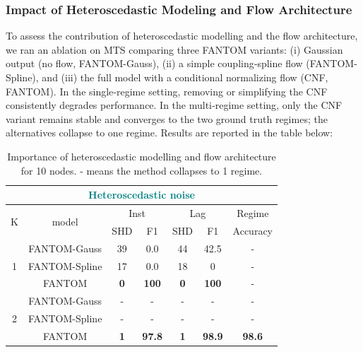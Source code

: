 \subsubsection{Impact of Heteroscedastic Modeling and Flow Architecture}
To assess the contribution of heteroscedastic modelling and the flow architecture, we ran an ablation on MTS comparing three FANTOM variants: (i) Gaussian output (no flow, FANTOM-Gauss), (ii) a simple coupling‑spline flow (FANTOM-Spline), and (iii) the full model with a conditional normalizing flow (CNF, FANTOM). In the single‑regime setting, removing or simplifying the CNF consistently degrades performance. In the multi‑regime setting, only the CNF variant remains stable and converges to the two ground truth regimes; the alternatives collapse to one regime. Results are reported in the table below:
\begin{table}[H]
\centering
\caption{Importance of heteroscedastic modelling and flow architecture for 10 nodes. - means the method collapses to 1 regime.}
\begin{tabular}{@{}ccccccc@{}}
\toprule
\multicolumn{7}{c}{\textcolor{teal}{Heteroscedastic noise}}                                                                                                                         \\ \midrule
\multicolumn{1}{c|}{\multirow{2}{*}{K}} & \multicolumn{1}{c|}{\multirow{2}{*}{model}} & \multicolumn{2}{c|}{Inst}       & \multicolumn{2}{c|}{Lag}        & Regime   \\ \cmidrule(l){3-7} 
\multicolumn{1}{c|}{}                   & \multicolumn{1}{c|}{}                       & SHD & \multicolumn{1}{c|}{F1}   & SHD & \multicolumn{1}{c|}{F1}   & Accuracy \\ \midrule
\multicolumn{1}{c|}{\multirow{3}{*}{1}} & \multicolumn{1}{c|}{FANTOM-Gauss}           & 39  & \multicolumn{1}{c|}{0.0}  & 44  & \multicolumn{1}{c|}{42.5} & -        \\
\multicolumn{1}{c|}{}                   & \multicolumn{1}{c|}{FANTOM-Spline}          & 17  & \multicolumn{1}{c|}{0.0}  & 18  & \multicolumn{1}{c|}{0}    & -        \\
\multicolumn{1}{c|}{}                   & \multicolumn{1}{c|}{FANTOM}                 & \textbf{0}   & \multicolumn{1}{c|}{\textbf{100}}  & \textbf{0}   & \multicolumn{1}{c|}{\textbf{100}}  & -        \\ \midrule
\multicolumn{1}{c|}{\multirow{3}{*}{2}} & \multicolumn{1}{c|}{FANTOM-Gauss}           & -   & \multicolumn{1}{c|}{-}    & -   & \multicolumn{1}{c|}{-}    & -        \\
\multicolumn{1}{c|}{}                   & \multicolumn{1}{c|}{FANTOM-Spline}          & -   & \multicolumn{1}{c|}{-}    & -   & \multicolumn{1}{c|}{-}    & -        \\
\multicolumn{1}{c|}{}                   & \multicolumn{1}{c|}{FANTOM}                 & \textbf{1}   & \multicolumn{1}{c|}{\textbf{97.8}} & \textbf{1}   & \multicolumn{1}{c|}{\textbf{98.9}} & \textbf{98.6}     \\ \bottomrule
\end{tabular}
\end{table}
